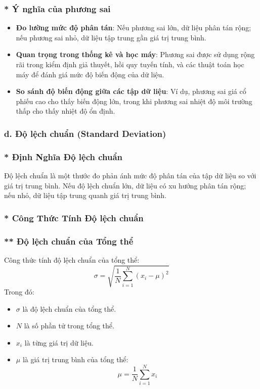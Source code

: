 \subsubsection*{* Ý nghĩa của phương sai}
\begin{itemize}
    \item \textbf{Đo lường mức độ phân tán}: Nếu phương sai lớn, dữ liệu phân tán rộng; nếu phương sai nhỏ, dữ liệu tập trung gần giá trị trung bình.
    \item \textbf{Quan trọng trong thống kê và học máy}: Phương sai được sử dụng rộng rãi trong kiểm định giả thuyết, hồi quy tuyến tính, và các thuật toán học máy để đánh giá mức độ biến động của dữ liệu.
    \item \textbf{So sánh độ biến động giữa các tập dữ liệu}: Ví dụ, phương sai giá cổ phiếu cao cho thấy biến động lớn, trong khi phương sai nhiệt độ môi trường thấp cho thấy nhiệt độ ổn định.
\end{itemize}


\subsubsection*{d. Độ lệch chuẩn (Standard Deviation)}
\subsubsection{* Định Nghĩa Độ lệch chuẩn}
Độ lệch chuẩn là một thước đo phản ánh mức độ phân tán của tập dữ liệu so với giá trị trung bình. Nếu độ lệch chuẩn lớn, dữ liệu có xu hướng phân tán rộng; nếu nhỏ, dữ liệu tập trung quanh giá trị trung bình.

\subsubsection{* Công Thức Tính Độ lệch chuẩn}
\subsubsection{** Độ lệch chuẩn của Tổng thể}
Công thức tính độ lệch chuẩn của tổng thể:
\begin{equation}
    \sigma = \sqrt{\frac{1}{N} \sum_{i=1}^{N} (x_i - \mu)^2}
\end{equation}
Trong đó:
\begin{itemize}
    \item $\sigma$ là độ lệch chuẩn của tổng thể.
    \item $N$ là số phần tử trong tổng thể.
    \item $x_i$ là từng giá trị dữ liệu.
    \item $\mu$ là giá trị trung bình của tổng thể:
    \begin{equation}
        \mu = \frac{1}{N} \sum_{i=1}^{N} x_i
    \end{equation}
\end{itemize}

